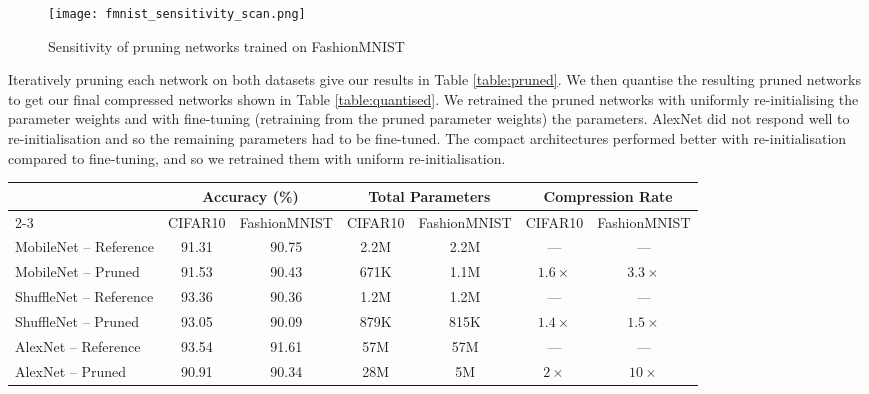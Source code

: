 \documentclass[conference]{IEEEtran}
\begin{document}
  \begin{figure}[]
      \centering
      \texttt{[image: fmnist\_sensitivity\_scan.png]}
      \caption{Sensitivity of pruning networks trained on FashionMNIST}
      \label{fig:fmnist_sen_scan}
  \end{figure}

Iteratively pruning each network on both datasets give our results in Table \ref{table:pruned}.
We then quantise the resulting pruned networks to get our final compressed networks shown in Table \ref{table:quantised}.
We retrained the pruned networks with uniformly re-initialising the parameter weights and with fine-tuning (retraining from the pruned parameter weights) the parameters. AlexNet did not respond well to re-initialisation and so the remaining parameters had to be fine-tuned. The compact architectures performed better with re-initialisation compared to fine-tuning, and so we retrained them with uniform re-initialisation. 




\begin{table*}[t]
    \centering
    \caption{Network pruning on CIFAR-10 and FashionMNIST}
    \begin{tabular}{@{\extracolsep{4pt}}lcccccc}
        \toprule
        
        \multicolumn{1}{c}{\multirow{2}{*}{\raisebox{-\heavyrulewidth}{\textbf{Network}}}} & \multicolumn{2}{c}{\textbf{Accuracy (\%)}} & \multicolumn{2}{c}{\textbf{Total Parameters}} & \multicolumn{2}{c}{\textbf{Compression Rate}} \\
        \cmidrule{2-3}
        \cmidrule{4-5}
        \cmidrule{6-7}
        {} & CIFAR10 & FashionMNIST & CIFAR10 & FashionMNIST & CIFAR10 & FashionMNIST \\ 
        \midrule
        MobileNet -- Reference  & 91.31 & 90.75 & 2.2M & 2.2M & --- & --- \\
        MobileNet -- Pruned     & 91.53 & 90.43 & 671K & 1.1M & $1.6\times$ & $3.3\times$ \\
        \midrule
        ShuffleNet -- Reference & 93.36 & 90.36 & 1.2M & 1.2M & --- & --- \\
        ShuffleNet -- Pruned    & 93.05 & 90.09 & 879K & 815K & $1.4\times$ & $1.5\times$ \\
        \midrule
        AlexNet -- Reference    & 93.54 & 91.61 & 57M & 57M & --- & --- \\
        AlexNet -- Pruned       & 90.91 & 90.34 & 28M & 5M & $2\times$ & $10\times$ \\
        \bottomrule
    \end{tabular}
    \label{table:pruned}
\end{table*}
\end{document}
